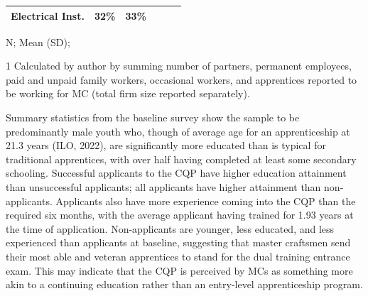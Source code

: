 \documentclass[
  11pt,
a4paper
]{article}
\begin{document}
\begin{table}[H]
\begin{threeparttable}
{\begin{tabular}[t]{lccccc}
\hspace{1em}\hspace{1em}Electrical Inst. & 32\% & 33\% &  &  & \\
\bottomrule
\end{tabular}}
\begin{tablenotes}
\small
\item N; Mean (SD); %
\item[1] Calculated by author by summing number of partners, permanent employees, paid and unpaid family workers, occasional workers, and apprentices reported to be working for MC (total firm size reported separately).
\end{tablenotes}
\end{threeparttable}
\end{table}

\noindent Summary statistics from the baseline survey show the sample to be predominantly male youth who, though of average age for an apprenticeship at 21.3 years (ILO, 2022), are significantly more educated than is typical for traditional apprentices, with over half having completed at least some secondary schooling. Successful applicants to the CQP have higher education attainment than unsuccessful applicants; all applicants have higher attainment than non-applicants. Applicants also have more experience coming into the CQP than the required six months, with the average applicant having trained for 1.93 years at the time of application. Non-applicants are younger, less educated, and less experienced than applicants at baseline, suggesting that master craftsmen send their most able and veteran apprentices to stand for the dual training entrance exam. This may indicate that the CQP is perceived by MCs as something more akin to a continuing education rather than an entry-level apprenticeship program.
\end{document}

